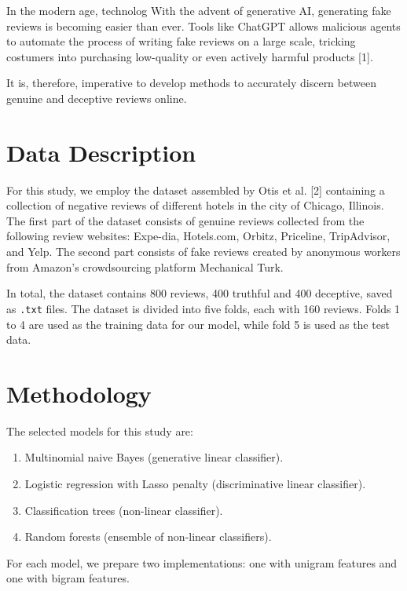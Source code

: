\documentclass[a4paper,11pt]{article}
\begin{document}
In the modern age, technolog
With the advent of generative AI, generating fake reviews is becoming easier than ever. Tools like ChatGPT allows malicious agents to automate the process of writing fake reviews on a large scale, tricking costumers into purchasing low-quality or even actively harmful products [1].    

It is, therefore, imperative to develop methods to accurately discern between genuine and deceptive reviews online. 

\section{Data Description}

For this study, we employ the dataset assembled by Otis et al. [2] containing a collection of negative reviews of different hotels in the city of Chicago, Illinois. The first part of the dataset consists of genuine reviews collected from the following review websites: Expe-dia, Hotels.com, Orbitz, Priceline, TripAdvisor, and Yelp. The second part consists of fake reviews created by anonymous workers from Amazon's crowdsourcing platform Mechanical Turk.   

In total, the dataset contains 800 reviews, 400 truthful and 400 deceptive, saved as \texttt{.txt} files. The dataset is divided into five folds, each with 160 reviews. Folds 1 to 4 are used as the training data for our model, while fold 5 is used as the test data. 



\section{Methodology}

The selected models for this study are:

\begin{enumerate}
  \item Multinomial naive Bayes (generative linear classifier).
  \item Logistic regression with Lasso penalty (discriminative linear classifier).
  \item Classification trees (non-linear classifier).
  \item Random forests (ensemble of non-linear classifiers).
\end{enumerate}

For each model, we prepare two implementations: one with unigram features and one with bigram features. 
\end{document}
